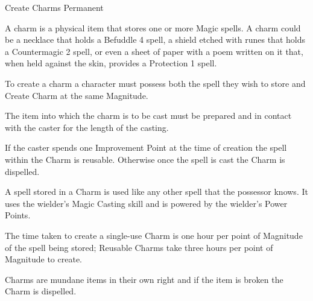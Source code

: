 \begin{rpg-spell}
{Create Charms}
{Permanent}

A charm is a physical item that stores one or more Magic spells. A charm could be a necklace that holds a Befuddle 4 spell, a shield etched with runes that holds a Countermagic 2 spell, or even a sheet of paper with a poem written on it that, when held against the skin, provides a Protection 1 spell.

\begin{rpg-list}
\item To create a charm a character must possess both the spell they wish to store and Create Charm at the same Magnitude.
\item The item into which the charm is to be cast must be prepared and in contact with the caster for the length of the casting.
\item If the caster spends one Improvement Point at the time of creation the spell within the Charm is reusable. Otherwise once the spell is cast the Charm is dispelled.
\item A spell stored in a Charm is used like any other spell that the possessor knows. It uses the wielder’s Magic Casting skill and is powered by the wielder’s Power Points.
\item The time taken to create a single-use Charm is one hour per point of Magnitude of the spell being stored; Reusable Charms take three hours per point of Magnitude to create.
\item Charms are mundane items in their own right and if the item is broken the Charm is dispelled.
\end{rpg-list}
\end{rpg-spell}


